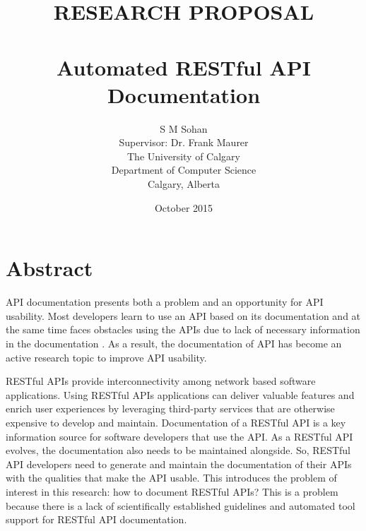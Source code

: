 \documentclass[11pt,oneside]{book}
\begin{document}
\title{RESEARCH PROPOSAL \\ $ $ \\
Automated RESTful API Documentation}

\author{S M Sohan \\
Supervisor: Dr. Frank Maurer \\
The University of Calgary \\
Department of Computer Science \\
Calgary, Alberta
}

\date{October 2015}


\maketitle

\frontmatter
% 

\mainmatter

\section{Abstract}

API documentation presents both a problem and an opportunity for API usability. Most developers learn to use an API based on its documentation and at the same time faces obstacles using the APIs due to lack of necessary information in the documentation \cite{Robillard_what_makes}. As a result, the documentation of API has become an active research topic to improve API usability.

RESTful APIs provide interconnectivity among network based software applications. Using RESTful APIs applications can deliver valuable features and enrich user experiences by leveraging third-party services that are otherwise expensive to develop and maintain. Documentation of a RESTful API is a key information source for software developers that use the API. As a RESTful API evolves, the documentation also needs to be maintained alongside. So, RESTful API developers need to generate and maintain the documentation of their APIs with the qualities that make the API usable. This introduces the problem of interest in this research: how to document RESTful APIs? This is a problem because there is a lack of scientifically established guidelines and automated tool support for RESTful API documentation.
\end{document}
